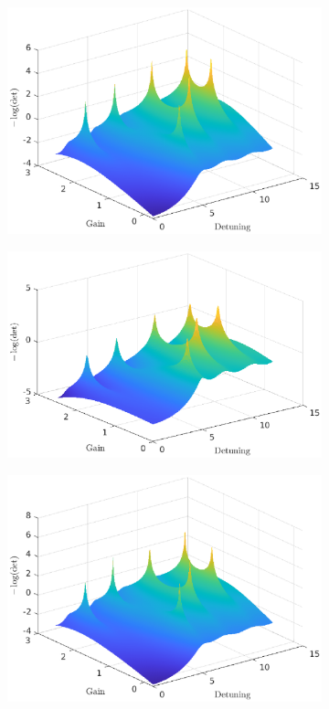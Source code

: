 \begin{figure}
	\centering
	\begin{subfigure}{0.32\textwidth}
		\includegraphics[width=\textwidth]{plots/simple/surface}
		\caption{}
		\label{fig:simple_cavity:mycwt_surf}
	\end{subfigure}
	\begin{subfigure}{0.32\textwidth}
		\includegraphics[width=\textwidth]{plots/simple/surface_topf}
		\caption{}
		\label{fig:simple_cavity:topf_surf}
	\end{subfigure}
	\begin{subfigure}{0.32\textwidth}
		\includegraphics[width=\textwidth]{plots/simple/surface_oseen}

\end{subfigure}
\end{figure}
